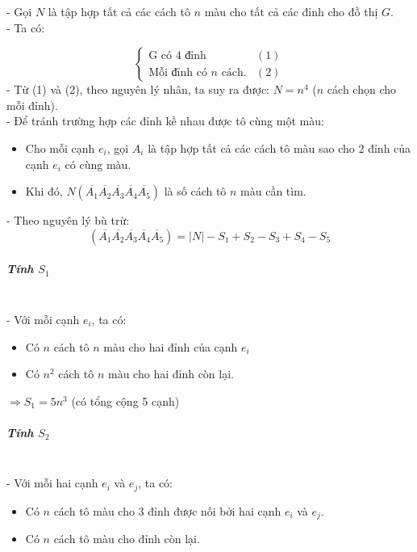 \documentclass[12pt]{article}
\begin{document}
\begin{sloppypar}
- Gọi \(N\) là tập hợp tất cả các cách tô \(n\) màu cho tất cả các đỉnh cho đồ thị \(G\). \\
- Ta có:

\[
    \begin{cases}
       \text{G có 4 đỉnh} & (1)\\
       \text{Mỗi đỉnh có } n \text{ cách.} & (2)
    \end{cases}
    \]
- Từ (1) và (2), theo nguyên lý nhân, ta suy ra được: \(N = n^{4}\) (\(n\) cách chọn cho mỗi đỉnh). \\
- Để tránh trường hợp các đỉnh kề nhau được tô cùng một màu:

\begin{itemize}
    \item Cho mỗi cạnh \(e_{i}\), gọi \(A_{i}\) là tập hợp tất cả các cách tô màu sao cho 2 đỉnh của cạnh \(e_{i}\) có cùng màu.
    \item Khi đó, \(N(\overline{A_{1}}\overline{A_{2}}\overline{A_{3}}\overline{A_{4}}\overline{A_{5}})\) là số cách tô \(n\) màu cần tìm.
\end{itemize}

- Theo nguyên lý bù trừ:
\begin{equation*}
    (\overline{A_{1}}\overline{A_{2}}\overline{A_{3}}\overline{A_{4}}\overline{A_{5}}) = |N| - S_{1} + S_{2} - S_{3} + S_{4} - S_{5}
\end{equation*}

\subparagraph{Tính \(S_{1}\)}\mbox{}\\

- Với mỗi cạnh \(e_{i}\), ta có:

\begin{itemize}
    \item Có \(n\) cách tô \(n\) màu cho hai đỉnh của cạnh \(e_{i}\)
    \item Có \(n^{2}\) cách tô \(n\) màu cho hai đỉnh còn lại.
\end{itemize}

\(\Rightarrow S_{1} = 5n^{3}\) (có tổng cộng 5 cạnh) 

\subparagraph{Tính \(S_{2}\)}\mbox{}\\

- Với mỗi hai cạnh \(e_{i}\) và \(e_{j}\), ta có:
\begin{itemize}
    \item Có \(n\) cách tô màu cho 3 đỉnh được nối bởi hai cạnh \(e_{i}\) và \(e_{j}\).
    \item Có \(n\) cách tô màu cho đỉnh còn lại.
\end{itemize}


\end{sloppypar}
\end{document}
